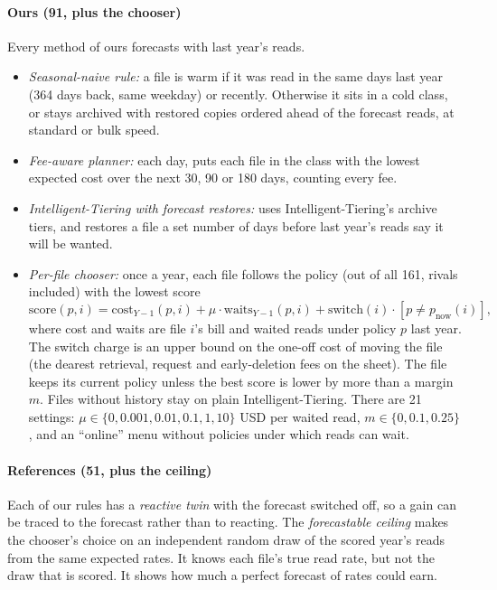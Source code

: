 \documentclass[11pt]{article}
\begin{document}
\paragraph{Ours (91, plus the chooser)} Every method of ours forecasts with last year's reads.
\begin{itemize}
  \item \emph{Seasonal-naive rule:} a file is warm if it was read in the same days last year (364 days back, same weekday) or recently. Otherwise it sits in a cold class, or stays archived with restored copies ordered ahead of the forecast reads, at standard or bulk speed.
  \item \emph{Fee-aware planner:} each day, puts each file in the class with the lowest expected cost over the next 30, 90 or 180 days, counting every fee.
  \item \emph{Intelligent-Tiering with forecast restores:} uses Intelligent-Tiering's archive tiers, and restores a file a set number of days before last year's reads say it will be wanted.
  \item \emph{Per-file chooser:} once a year, each file follows the policy (out of all 161, rivals included) with the lowest score
  \[
    \text{score}(p, i) = \text{cost}_{Y-1}(p, i) + \mu \cdot \text{waits}_{Y-1}(p, i) + \text{switch}(i)\cdot[p \neq p_{\text{now}}(i)],
  \]
  where cost and waits are file $i$'s bill and waited reads under policy $p$ last year. The switch charge is an upper bound on the one-off cost of moving the file (the dearest retrieval, request and early-deletion fees on the sheet). The file keeps its current policy unless the best score is lower by more than a margin $m$. Files without history stay on plain Intelligent-Tiering. There are 21 settings: $\mu \in \{0, 0.001, 0.01, 0.1, 1, 10\}$ USD per waited read, $m \in \{0, 0.1, 0.25\}$, and an ``online'' menu without policies under which reads can wait.
\end{itemize}

\paragraph{References (51, plus the ceiling)} Each of our rules has a \emph{reactive twin} with the forecast switched off, so a gain can be traced to the forecast rather than to reacting. The \emph{forecastable ceiling} makes the chooser's choice on an independent random draw of the scored year's reads from the same expected rates. It knows each file's true read rate, but not the draw that is scored. It shows how much a perfect forecast of rates could earn.
\end{document}
